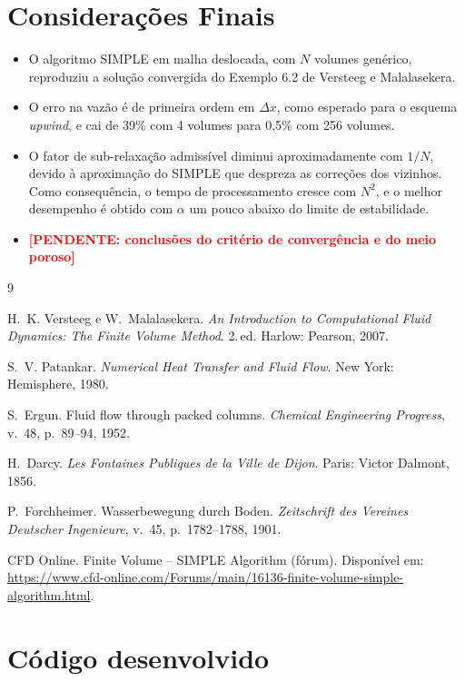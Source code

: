 \documentclass[11pt,a4paper]{article}
\newcommand{\pendente}[1]{\textcolor{red}{\textbf{[PENDENTE: #1]}}}
\begin{document}
\section{Considerações Finais}

\begin{itemize}
  \item O algoritmo SIMPLE em malha deslocada, com $N$ volumes genérico,
        reproduziu a solução convergida do Exemplo 6.2 de Versteeg e
        Malalasekera.
  \item O erro na vazão é de primeira ordem em $\Delta x$, como esperado
        para o esquema \emph{upwind}, e cai de 39\% com 4 volumes para
        0,5\% com 256 volumes.
  \item O fator de sub-relaxação admissível diminui aproximadamente com
        $1/N$, devido à aproximação do SIMPLE que despreza as correções dos
        vizinhos. Como consequência, o tempo de processamento cresce com
        $N^2$, e o melhor desempenho é obtido com $\alpha$ um pouco abaixo
        do limite de estabilidade.
  \item \pendente{conclusões do critério de convergência e do meio poroso}
\end{itemize}

\begin{thebibliography}{9}

H.~K. Versteeg e W.~Malalasekera.
\emph{An Introduction to Computational Fluid Dynamics: The Finite Volume
Method}. 2.\,ed. Harlow: Pearson, 2007.

S.~V. Patankar.
\emph{Numerical Heat Transfer and Fluid Flow}.
New York: Hemisphere, 1980.

S.~Ergun.
Fluid flow through packed columns.
\emph{Chemical Engineering Progress}, v.~48, p.~89--94, 1952.

H.~Darcy.
\emph{Les Fontaines Publiques de la Ville de Dijon}.
Paris: Victor Dalmont, 1856.

P.~Forchheimer.
Wasserbewegung durch Boden.
\emph{Zeitschrift des Vereines Deutscher Ingenieure}, v.~45,
p.~1782--1788, 1901.

CFD Online.
Finite Volume -- SIMPLE Algorithm (fórum).
Disponível em: \url{https://www.cfd-online.com/Forums/main/16136-finite-volume-simple-algorithm.html}.

\end{thebibliography}

\appendix
\section{Código desenvolvido}


\end{document}
